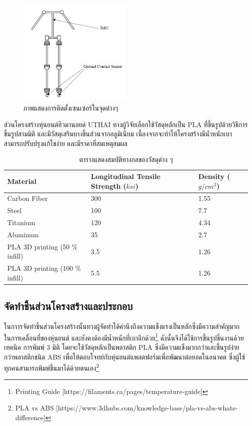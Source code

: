 \begin{figure}[!ht]
    \centering
    \includegraphics[width=0.5\textwidth]{chapter3/images/uthai_sensor.PNG}
    \caption{ภาพแสดงการติดตั้งเซนเซอร์ในจุดต่างๆ}
    \label{fig:uthai_structure2}
\end{figure}

ส่วนโครงสร้างหุ่นยนต์ฮิวมานอยด์ UTHAI ทางผู้วิจัยเลือกใช้วัสดุหลักเป็น PLA ที่ขึ้นรูปด้วยวิธีการขึ้นรูปสามมิติ
และมีวัสดุเสริมบางชิ้นส่วนจากอลูมิเนียม เนื่องจากจะทำให้โครงสร้างมีน้ำหนักเบา สามารถปรับปรุงแก้ไขง่าย และมีราคาที่สมเหตุสมผล
\begin{table}[ht]
	\centering
	\begin{tabular}{| l | l | l |}
		\hline
		Material & Longitudinal Tensile Strength ($ksi$) & Density ($g/cm^3$) \\
        \hline
        Carbon Fiber & 300 & 1.55 \\
        Steel & 100	& 7.7 \\
        Titanium & 120 & 4.34 \\
        Aluminum & 35 & 2.7 \\
        PLA 3D printing (50 \% infill) & 3.5 & 1.26 \\
        PLA 3D printing (100 \% infill) & 5.5 & 1.26 \\
	    \hline
	\end{tabular}
	\caption{ตารางแสดงสมบัติทางกลของวัสดุต่าง ๆ}
	\label{tab:material_properties}
\end{table}

\clearpage
\subsection{จัดทำชิ้นส่วนโครงสร้างและประกอบ}
ในกาารจัดทำชิ้นส่วนโครงสร้างนั้นทางผู้จัดทำได้คำนึงถึงความแข็งแรงเป็นหลักซึ่งมีความสำคัญมาก
ในการเคลื่อนที่ของหุ่นยนต์ และยังคงต้องมีน้ำหนักที่เบาอีกด้วย\footnote{ Printing Guide [https://filaments.ca/pages/temperature-guide]}
ดังนั้นจึงได้ใช้การขึ้นรูปชิ้นงานด้วยเทคนิค
การพิมพ์ 3 มิติ โดยจะใช้วัสดุหลักเป็นพลาสติก PLA ซึ่งมีความแข็งมากกว่าและขึ้นรูปง่ายกว่าพลาสติกชนิด ABS
เพื่อให้ตอบโจทย์กับหุ่นยนต์แพลตฟอร์มเพื่อพัฒนาต่อยอดในอนาคต ซึ่งผู้ใช้ทุกคนสามารถพิมพ์ขึ้นมาได้ด้วยตนเอง\footnote{ PLA vs ABS [https://www.3dhubs.com/knowledge-base/pla-vs-abs-whats-difference]}

